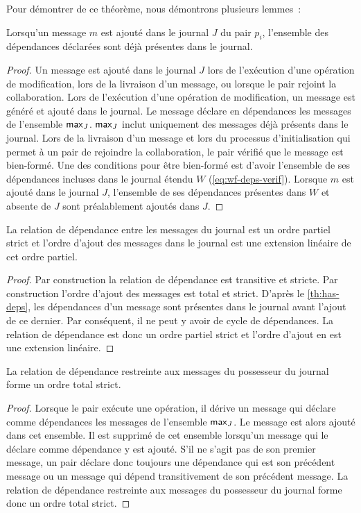 Pour démontrer de ce théorème, nous démontrons plusieurs lemmes~:

\begin{lemma}\label{th:has-deps}
Lorsqu'un message $m$ est ajouté dans le journal $J$ du pair $p_i$, l'ensemble des dépendances déclarées sont déjà présentes dans le journal.
\end{lemma} 
\begin{proof}
Un message est ajouté dans le journal $J$ lors de l'exécution d'une opération de modification, lors de la livraison d'un message, ou lorsque le pair rejoint la collaboration.
Lors de l'exécution d'une opération de modification, un message est généré et ajouté dans le journal.
Le message déclare en dépendances les messages de l'ensemble $\operatorname{\mathsf{max}}_J$.
$\operatorname{\mathsf{max}}_J$ inclut uniquement des messages déjà présents dans le journal.
Lors de la livraison d'un message et lors du processus d'initialisation qui permet à un pair de rejoindre la collaboration, le pair vérifié que le message est bien-formé.
Une des conditions pour être bien-formé est d'avoir l'ensemble de ses dépendances incluses dans le journal étendu $W$ (\autoref{eq:wf-deps-verif}).
Lorsque $m$ est ajouté dans le journal $J$, l'ensemble de ses dépendances présentes dans $W$ et absente de $J$ sont préalablement ajoutés dans $J$.
\end{proof}

\begin{lemma}
La relation de dépendance entre les messages du journal est un ordre partiel strict et l'ordre d'ajout des messages dans le journal est une extension linéaire de cet ordre partiel.
\end{lemma}
\begin{proof}
Par construction la relation de dépendance est transitive et stricte.
Par construction l'ordre d'ajout des messages est total et strict.
D'après le \autoref{th:has-deps}, les dépendances d'un message sont présentes dans le journal avant l'ajout de ce dernier.
Par conséquent, il ne peut y avoir de cycle de dépendances.
La relation de dépendance est donc un ordre partiel strict et l'ordre d'ajout en est une extension linéaire.
\end{proof}

\begin{lemma}\label{th:total-dep-owner}
La relation de dépendance restreinte aux messages du possesseur du journal forme un ordre total strict.
\end{lemma}
\begin{proof}
Lorsque le pair exécute une opération, il dérive un message qui déclare comme dépendances les messages de l'ensemble $\operatorname{\mathsf{max}}_J$.
Le message est alors ajouté dans cet ensemble.
Il est supprimé de cet ensemble lorsqu'un message qui le déclare comme dépendance y est ajouté.
S'il ne s'agit pas de son premier message, un pair déclare donc toujours une dépendance qui est son précédent message ou un message qui dépend transitivement de son précédent message.
La relation de dépendance restreinte aux messages du possesseur du journal forme donc un ordre total strict.
\end{proof}

